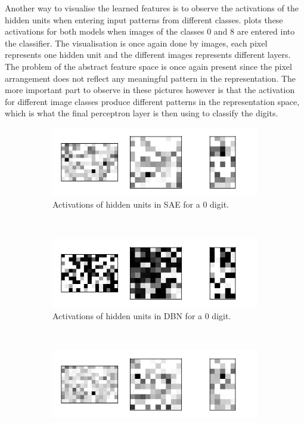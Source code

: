 \documentclass{article}
\begin{document}
Another way to visualise the learned features is to observe the activations of the hidden units
when entering input patterns from different classes.
 plots these activations for both models
when images of the classes 0 and 8 are entered into the classifier.
The visualisation is once again done by images,
each pixel represents one hidden unit
and the different images represents different layers.
The problem of the abstract feature space is once again present
since the pixel arrangement does not reflect any meaningful pattern in the representation.
The more important part to observe in these pictures however is that the activation for different image classes
produce different patterns in the representation space,
which is what the final perceptron layer is then using to classify the digits.
\begin{figure}[!ht]
  \centering
  \begin{subfigure}[t]{0.47\textwidth}
    \centering
    \includegraphics[width=\textwidth]{../plots/3_2_2/sae_d0_activations.png}
    \caption{Activations of hidden units in SAE for a 0 digit.}
    \label{fig:saeactivation0}
  \end{subfigure}
  ~
  \begin{subfigure}[t]{0.47\textwidth}
    \centering
    \includegraphics[width=\textwidth]{../plots/3_2_2/dbn_d0_activations.png}
    \caption{Activations of hidden units in DBN for a 0 digit.}
    \label{fig:bdnactivation0}
  \end{subfigure}
  ~
  \begin{subfigure}[t]{0.47\textwidth}
    \centering
    \includegraphics[width=\textwidth]{../plots/3_2_2/sae_d8_activations.png}

\end{subfigure}
\end{figure}
\end{document}
